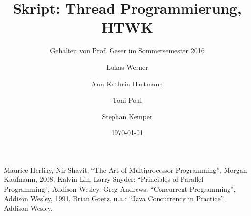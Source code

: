 \documentclass[a4paper]{scrreprt}
\title{Skript: Thread Programmierung, HTWK}
\subtitle{Gehalten von Prof. Geser im Sommersemester 2016}
\author{Lukas Werner \and Ann Kathrin Hartmann \and Toni Pohl \and Stephan Kemper}
\date{\today}
\begin{document}
	
\maketitle

\tableofcontents








\begin{thebibliography}{x}
Maurice Herlihy, Nir-Shavit: "`The Art of Multiprocessor Programming"', Morgan Kaufmann, 2008.
Kalvin Lin, Larry Snyder: "`Principles of Parallel Programming"', Addison Wesley.
Greg Andrews: "`Concurrent Programming"', Addison Wesley, 1991.
Brian Goetz, u.a.: "`Java Concurrency in Practice"', Addison Wesley.
\end{thebibliography}
\end{document}
